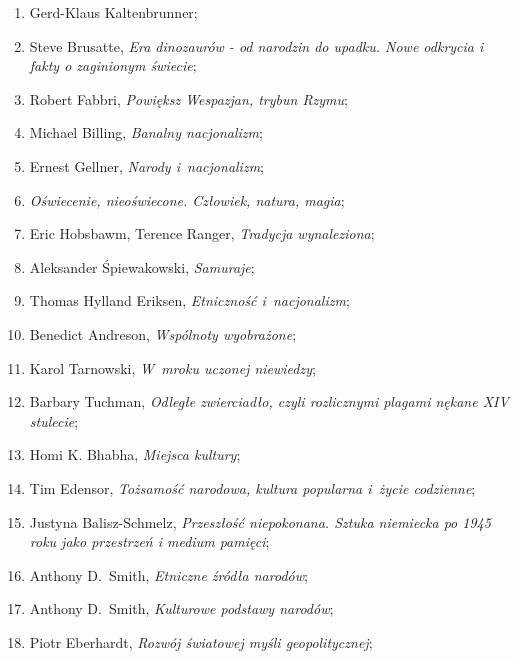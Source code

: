 \documentclass[a4paper,11pt]{article}
\begin{document}
\begin{enumerate}
\item Gerd-Klaus Kaltenbrunner;

\item Steve Brusatte, \emph{Era dinozaurów - od narodzin do upadku.
    Nowe odkrycia i fakty o zaginionym świecie};

\item Robert Fabbri, \emph{Powiększ Wespazjan, trybun Rzymu};

\item Michael Billing, \emph{Banalny nacjonalizm};

\item Ernest Gellner, \emph{Narody i~nacjonalizm};

\item \emph{Oświecenie, nieoświecone. Człowiek, natura, magia};

\item Eric Hobsbawm, Terence Ranger, \emph{Tradycja wynaleziona};

\item Aleksander Śpiewakowski, \emph{Samuraje};

\item Thomas Hylland Eriksen, \emph{Etniczność i~nacjonalizm};

\item Benedict Andreson, \emph{Wspólnoty wyobrażone};

\item Karol Tarnowski, \emph{W~mroku uczonej niewiedzy};

\item Barbary Tuchman, \emph{Odległe zwierciadło, czyli rozlicznymi
    plagami nękane XIV stulecie};

\item Homi K. Bhabha, \emph{Miejsca kultury};

\item Tim Edensor, \emph{Tożsamość narodowa, kultura popularna i~życie
    codzienne};

\item Justyna Balisz-Schmelz, \emph{Przeszłość niepokonana. Sztuka
    niemiecka po 1945 roku jako przestrzeń i medium pamięci};

\item Anthony D.~Smith, \emph{Etniczne źródła narodów};

\item Anthony D.~Smith, \emph{Kulturowe podstawy narodów};

\item Piotr Eberhardt, \emph{Rozwój światowej myśli geopolitycznej};


\end{enumerate}
\end{document}
